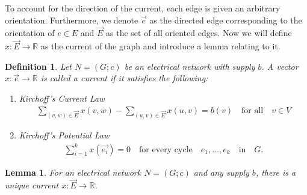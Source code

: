 \documentclass[10pt]{siamltex}
\newtheorem{mydef}{Definition}
\newtheorem{mylem}{Lemma}
\begin{document}
\begin{pagewiselinenumbers}
To account for the direction of the current, each edge is given an arbitrary orientation. Furthermore, we denote $\vec{e}$ as the directed edge corresponding to the orientation of $e \in E$ and $\vec{E}$ as the set of all oriented edges. Now we will define $x: \vec{E} \rightarrow \mathbb{R}$ as the current of the graph and introduce a lemma relating to it. 
\vspace{5mm}
\begin{mydef}
Let $N = (G;c)$ be an electrical network with supply $b$. A vector $x: \vec{e} \rightarrow \mathbb{R}$ is called a \emph{current} if it satisfies the following:
\begin{enumerate}
\item Kirchoff's Current Law
\begin{align}
\sum_{(v,w) \in \vec{E}} x(v,w) - \sum_{(u,v) \in \vec{E}} x(u,v) = b(v) \quad \textrm{for all} \quad v \in V
\end{align}
\item Kirchoff's Potential Law
\begin{align}
\sum_{i=1}^k x(\vec{e_i}) = 0 \quad \textrm{for every cycle} \quad e_1, ..., e_k \quad \textrm{in} \quad G.
\end{align}
\end{enumerate}
\end{mydef}

\begin{mylem}
For an electrical network $N = (G;c)$ and any supply $b$, there is a unique current $x: \vec{E} \rightarrow \mathbb{R}$.
\end{mylem}
\vspace{5mm}


\end{pagewiselinenumbers}
\end{document}
